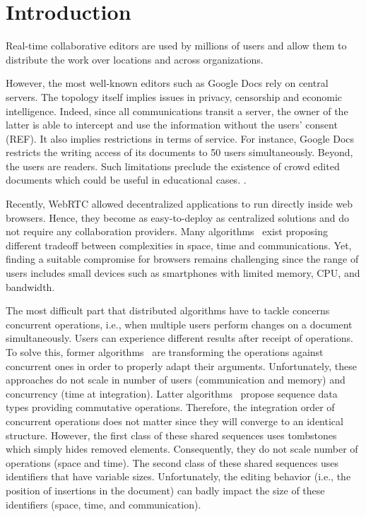 
\section{Introduction}

Real-time collaborative editors are used by millions of users and allow them to
distribute the work over locations and across organizations.

However, the most well-known editors such as Google Docs rely on central
servers. The topology itself implies issues in privacy, censorship and economic
intelligence. Indeed, since all communications transit a server, the owner of
the latter is able to intercept and use the information without the users'
consent (REF).  It also implies restrictions in terms of service. For instance,
Google Docs restricts the writing access of its documents to 50 users
simultaneously. Beyond, the users are readers. Such limitations preclude the
existence of crowd edited documents which could be useful in educational cases.
.

Recently, WebRTC allowed decentralized applications to run directly inside web
browsers. Hence, they become as easy-to-deploy as centralized solutions and do
not require any collaboration providers. Many algorithms~\cite{oster2006data,
  sun1998operational, sun2009contextbased} exist proposing different tradeoff
between complexities in space, time and communications. Yet, finding a suitable
compromise for browsers remains challenging since the range of users includes
small devices such as smartphones with limited memory, CPU, and bandwidth.

The most difficult part that distributed algorithms have to tackle concerns
concurrent operations, i.e., when multiple users perform changes on a document
simultaneously. Users can experience different results after receipt of
operations. To solve this, former algorithms~\cite{} are transforming the
operations against concurrent ones in order to properly adapt their arguments.
Unfortunately, these approaches do not scale in number of users (communication
and memory) and concurrency (time at integration). Latter algorithms~\cite{}
propose sequence data types providing commutative operations. Therefore, the
integration order of concurrent operations does not matter since they will
converge to an identical structure. However, the first class of these shared
sequences uses tombstones which simply hides removed elements. Consequently,
they do not scale number of operations (space and time). The second class of
these shared sequences uses identifiers that have variable sizes. Unfortunately,
the editing behavior (i.e., the position of insertions in the document) can
badly impact the size of these identifiers (space, time, and communication).

